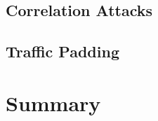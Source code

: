\blindtext

\subsection{Correlation Attacks}

\blindtext

\subsection{Traffic Padding}

\blindtext








\section{Summary}

\blindtext
